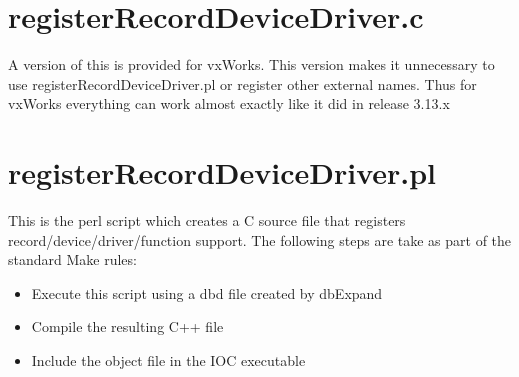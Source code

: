 \section{registerRecordDeviceDriver.c}

A version of this is provided for vxWorks. This version makes it unnecessary to use registerRecordDeviceDriver.pl or 
register other external names. Thus for vxWorks everything can work almost exactly like it did in release 3.13.x

\section{registerRecordDeviceDriver.pl}

This is the perl script which creates a C source file that registers record/device/driver/function support. The following 
steps are take as part of the standard Make rules:

\begin{itemize}\item Execute this script using a dbd file created by dbExpand

\item Compile the resulting C++ file

\item Include the object file in the IOC executable

\end{itemize}
